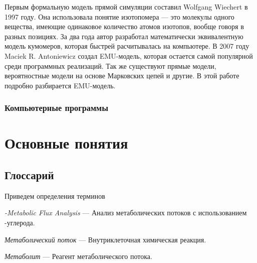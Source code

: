 \documentclass[a4paper, 12pt, left=30mm, right=15mm, top=20mm, bottom=20mm]{report}
\begin{document}
Первым формальную модель прямой симуляции составил 	
Wolfgang Wiechert\cite{Wiechert_1997_1, Wiechert_1997_2} в 1997 году. Она использовала понятие изотопомера --- это молекулы одного вещества, имеющие одинаковое количество атомов изотопов, вообще говоря в разных позициях. За два года автор разработал математически эквивалентную модель кумомеров\cite{Wiechert_1999_3, Wiechert_1999_4}, которая быстрей расчитывалась на компьютере. В 2007 году Maciek R. Antoniewicz создал EMU-модель\cite{EMU_2007}, которая остается самой популярной среди программных реализаций. Так же существуют прямые модели\cite{Direct_MFA}, вероятностные модели на основе Марковских цепей\cite{Markov_chain_MFA} и другие\cite{Fluxomer_MFA}. В этой работе подробно разбирается EMU-модель.

\subsection{Компьютерные программы}

\chapter{Основные понятия}
\section{Глоссарий}
Приведем определения терминов 

\emph{-Metabolic Flux Analysis} --- Анализ метаболических потоков с использованием -углерода.

\emph{Метаболический поток} --- Внутриклеточная химическая реакция.

\emph{Метаболит} --- Реагент метаболического потока.
\clearpage
\end{document}
